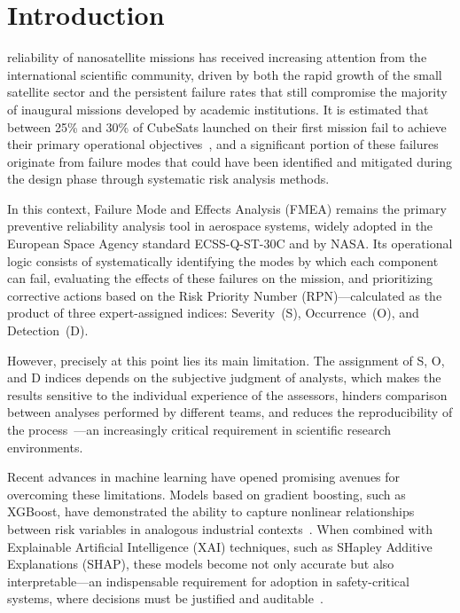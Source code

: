 \section{Introduction}
\label{sec:introduction}
 reliability of nanosatellite missions has received increasing attention from the international scientific community, driven by both the rapid growth of the small satellite sector and the persistent failure rates that still compromise the majority of inaugural missions developed by academic institutions. It is estimated that between 25\% and 30\% of CubeSats launched on their first mission fail to achieve their primary operational objectives~\cite{villela2019towards}, and a significant portion of these failures originate from failure modes that could have been identified and mitigated during the design phase through systematic risk analysis methods.

In this context, Failure Mode and Effects Analysis (FMEA) remains the primary preventive reliability analysis tool in aerospace systems, widely adopted in the European Space Agency standard ECSS-Q-ST-30C and by NASA. Its operational logic consists of systematically identifying the modes by which each component can fail, evaluating the effects of these failures on the mission, and prioritizing corrective actions based on the Risk Priority Number (RPN)---calculated as the product of three expert-assigned indices: Severity~(S), Occurrence~(O), and Detection~(D).

However, precisely at this point lies its main limitation. The assignment of S, O, and D indices depends on the subjective judgment of analysts, which makes the results sensitive to the individual experience of the assessors, hinders comparison between analyses performed by different teams, and reduces the reproducibility of the process~\cite{amwrpn2018,geomean_fmea2019,liu2016fmea_uncertainty}---an increasingly critical requirement in scientific research environments.

Recent advances in machine learning have opened promising avenues for overcoming these limitations. Models based on gradient boosting, such as XGBoost, have demonstrated the ability to capture nonlinear relationships between risk variables in analogous industrial contexts~\cite{alrefaie2020enhancing}. When combined with Explainable Artificial Intelligence (XAI) techniques, such as SHapley Additive Explanations (SHAP), these models become not only accurate but also interpretable---an indispensable requirement for adoption in safety-critical systems, where decisions must be justified and auditable~\cite{xai_xgboost_shap2025,chen2024interpretable}.


